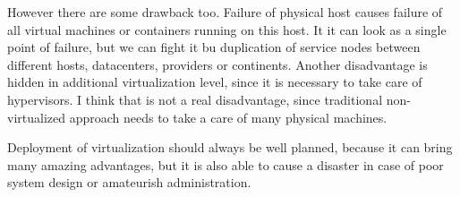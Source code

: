 However there are some drawback too. Failure of physical host causes failure of all virtual machines or containers running on this host. It it can look as a single point of failure, but we can fight it bu duplication of service nodes between different hosts, datacenters, providers or continents.
Another disadvantage is hidden in additional virtualization level, since it is necessary to take care of hypervisors. I think that is not a real disadvantage, since traditional non-virtualized approach needs to take a care of many physical machines.

Deployment of virtualization should always be well planned, because it can bring many amazing advantages, but it is also able to cause a disaster in case of poor system design or amateurish administration.
